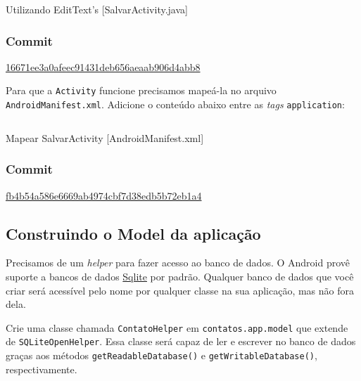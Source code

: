 \begin{listing}[H]
  \inputminted[linenos=true,frame=bottomline,tabsize=3]{ java }{ source/SalvarActivity-1.java }
  \caption{Utilizando EditText's [SalvarActivity.java]}
\end{listing}

\subsubsection{Commit}

\href{https://github.com/atilacamurca/guia-aberto-android-contatos/commit/16671ee3a0afeec91431deb656aeaab906d4abb8}{16671ee3a0afeec91431deb656aeaab906d4abb8}

\bigskip

Para que a \texttt{Activity} funcione precisamos mapeá-la no arquivo
\texttt{AndroidManifest.xml}. Adicione o conteúdo abaixo entre as
\emph{tags} \texttt{application}:

\begin{listing}[H]
  \inputminted[linenos=true,frame=bottomline,tabsize=3]{ xml }{ source/AndroidManifest-2.xml }
  \caption{Mapear SalvarActivity [AndroidManifest.xml]}
\end{listing}

\subsubsection{Commit}

\href{https://github.com/atilacamurca/guia-aberto-android-contatos/commit/fb4b54a586e6669ab4974cbf7d38edb5b72eb1a4}{fb4b54a586e6669ab4974cbf7d38edb5b72eb1a4}

\subsection{Construindo o Model da aplicação \label{ssec:model}}

Precisamos de um \emph{helper} para fazer acesso ao banco de dados. O
Android provê suporte a bancos de dados
\href{http://sqlite.org/}{Sqlite} por padrão. Qualquer banco de dados
que você criar será acessível pelo nome por qualquer classe na sua
aplicação, mas não fora dela.

Crie uma classe chamada \texttt{ContatoHelper} em
\texttt{contatos.app.model} que extende de \texttt{SQLiteOpenHelper}.
Essa classe será capaz de ler e escrever no banco de dados graças aos
métodos \texttt{getReadableDatabase()} e \texttt{getWritableDatabase()},
respectivamente.

